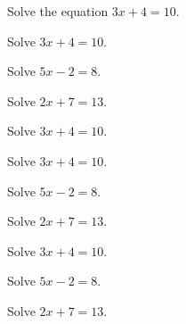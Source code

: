 \documentclass{worksheet}
\begin{document}
\begin{maketitle}
\end{maketitle}

\begin{name}
\end{name}

\begin{question}
    Solve the equation \(3x+4=10\).
\end{question}

\begin{linebreak}
\end{linebreak}

\begin{question}
    \begin{parts}
        \begin{questionpart}
            Solve \(3x+4=10\).
        \end{questionpart}
        \begin{questionpart}
            Solve \(5x-2=8\).
        \end{questionpart}
        \begin{questionpart}
            Solve \(2x+7=13\).
        \end{questionpart}
        \begin{questionpart}
            Solve \(3x+4=10\).
        \end{questionpart}
    \end{parts}
\end{question}

\begin{linebreak}
\end{linebreak}

\begin{question}
    \begin{parts}[columns=3]
        \begin{questionpart}
            Solve \(3x+4=10\).
        \end{questionpart}
        \begin{questionpart}
            Solve \(5x-2=8\).
        \end{questionpart}
        \begin{questionpart}
            Solve \(2x+7=13\).
        \end{questionpart}
        \begin{questionpart}
            Solve \(3x+4=10\).
        \end{questionpart}
        \begin{questionpart}
            Solve \(5x-2=8\).
        \end{questionpart}
        \begin{questionpart}
            Solve \(2x+7=13\).
        \end{questionpart}
    \end{parts}
\end{question}
\end{document}
